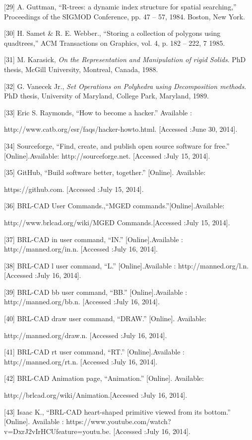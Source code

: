 \documentclass[11pt, oneside]{Thesis} %
\begin{document}
[29] A. Guttman, “R-trees: a dynamic index structure for spatial searching,” Proceedings
of the SIGMOD Conference, pp. 47 – 57, 1984. Boston, New York.

[30] H. Samet & R. E. Webber., “Storing a collection of polygons using quadtrees,” ACM
Transactions on Graphics, vol. 4, p. 182 – 222, 7 1985.

[31] M. Karasick, \textit{On the Representation and Manipulation of rigid Solids}. PhD thesis,
McGill University, Montreal, Canada, 1988.

[32] G. Vanecek Jr., \textit{Set Operations on Polyhedra using Decomposition methods}. PhD
thesis, University of Maryland, College Park, Maryland, 1989.

[33] Eric S. Raymonds, “How to become a hacker.” Available : 

http://www.catb.org/esr/faqs/hacker-howto.html. [Accessed :June 30, 2014].

[34] Sourceforge, “Find, create, and publish open source software for free.” 
[Online].Available: http://sourceforge.net. [Accessed :July 15, 2014].

[35] GitHub, “Build software better, together.” [Online]. Available: 

https://github.com. [Accessed :July 15, 2014].

[36] BRL-CAD User Commands.,“MGED commands.”[Online].Available:

http://www.brlcad.org/wiki/MGED Commands.[Accessed :July 15, 2014].

[37] BRL-CAD in user command, “IN.” [Online].Available : http://manned.org/in.n. 
[Accessed :July 16, 2014].

[38] BRL-CAD l user command, “L.” [Online].Available : http://manned.org/l.n. 
[Accessed :July 16, 2014].

[39] BRL-CAD bb user command, “BB.” [Online].Available : http://manned.org/bb.n. 
[Accessed :July 16, 2014].

[40] BRL-CAD draw user command, “DRAW.” [Online]. Available:

http://manned.org/draw.n. [Accessed :July 16, 2014].

[41] BRL-CAD rt user command, “RT.” [Online].Available : http://manned.org/rt.n. 
[Accessed :July 16, 2014].

[42] BRL-CAD Animation page, “Animation.” [Online]. Available:

http://brlcad.org/wiki/Animation.[Accessed :July 16, 2014].

[43] Isaac K., “BRL-CAD heart-shaped primitive viewed from its bottom.” [Online].
Available : https://www.youtube.com/watch?v=DxrJ2vIrHCUfeature=youtu.be.
[Accessed :July 16, 2014].
\end{document}
